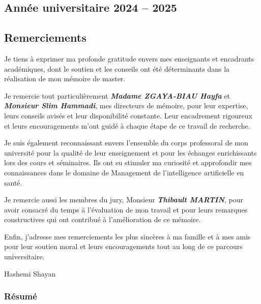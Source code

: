 \documentclass[
]{article}
\begin{document}
\hypertarget{annuxe9e-universitaire-2024-2025}{%
\subsection{Année universitaire 2024 -- 2025}\label{annuxe9e-universitaire-2024-2025}}

\hypertarget{section-19}{%
\subsection{}\label{section-19}}

\hypertarget{remerciements}{%
\subsection{Remerciements}\label{remerciements}}

Je tiens à exprimer ma profonde gratitude envers mes enseignants et encadrants académiques, dont le soutien et les conseils ont été déterminants dans la réalisation de mon mémoire de master.

Je remercie tout particulièrement \emph{\textbf{Madame ZGAYA-BIAU Hayfa}} et \emph{\textbf{Monsieur Slim Hammadi}}, mes directeurs de mémoire, pour leur expertise, leurs conseils avisés et leur disponibilité constante. Leur encadrement rigoureux et leurs encouragements m'ont guidé à chaque étape de ce travail de recherche.

Je suis également reconnaissant envers l'ensemble du corps professoral de mon université pour la qualité de leur enseignement et pour les échanges enrichissants lors des cours et séminaires. Ils ont su stimuler ma curiosité et approfondir mes connaissances dans le domaine de Management de l'intelligence artificielle en santé.

Je remercie aussi les membres du jury, Monsieur \emph{\textbf{Thibault MARTIN}}, pour avoir consacré du temps à l'évaluation de mon travail et pour leurs remarques constructives qui ont contribué à l'amélioration de ce mémoire.

Enfin, j'adresse mes remerciements les plus sincères à ma famille et à mes amis pour leur soutien moral et leurs encouragements tout au long de ce parcours universitaire.

Hashemi Shayan

\hypertarget{ruxe9sumuxe9}{%
\subsubsection{Résumé}\label{ruxe9sumuxe9}}
\end{document}
